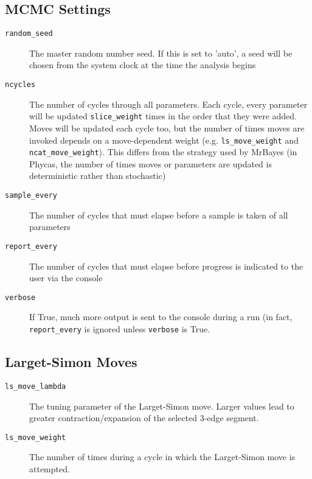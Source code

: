 \documentclass[10pt]{article}
\begin{document}
\subsection{MCMC Settings}
\begin{description}
\item[{\tt random\_seed}] The master random number seed. If this is set to 'auto', a seed will be chosen from the system clock at the time the analysis begins
\item[{\tt ncycles}] The number of cycles through all parameters. Each cycle, every parameter will be updated \verb+slice_weight+ times in the order that they were added. Moves will be updated each cycle too, but the number of times moves are invoked depends on a move-dependent weight (e.g. \verb+ls_move_weight+ and \verb+ncat_move_weight+). This differs from the strategy used by MrBayes (in Phycas, the number of times moves or parameters are updated is deterministic rather than stochastic)
\item[{\tt sample\_every}] The number of cycles that must elapse before a sample is taken of all parameters
\item[{\tt report\_every}] The number of cycles that must elapse before progress is indicated to the user via the console
\item[{\tt verbose}] If True, much more output is sent to the console during a run (in fact, \verb+report_every+ is ignored unless \verb+verbose+ is True.
\end{description}

\subsection{Larget-Simon Moves}
\begin{description}
\item[{\tt ls\_move\_lambda}] The tuning parameter of the Larget-Simon move. Larger values lead to greater contraction/expansion of the selected 3-edge segment.
\item[{\tt ls\_move\_weight}] The number of times during a cycle in which the Larget-Simon move is attempted.
\end{description}
\end{document}
